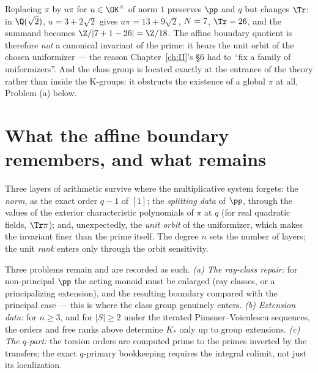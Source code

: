 \begin{remark}\label{XXX:rem:units}
Replacing $\pi$ by $u\pi$ for $u\in\OK^\times$ of norm $1$ preserves $\pp$ and $q$ but
changes $\Tr$: in $\Q(\sqrt2)$, $u=3+2\sqrt2$ gives $u\pi=13+9\sqrt2$, $N=7$,
$\Tr=26$, and the summand becomes $\Z/|7+1-26|=\Z/18$. The affine boundary quotient is
therefore \emph{not} a canonical invariant of the prime: it hears the unit orbit of the
chosen uniformizer --- the reason Chapter~\ref{ch:II}'s \S6 had to ``fix a family of uniformizers''.
And the class group is located exactly at the entrance of the theory rather than inside
the K-groups: it obstructs the existence of a global $\pi$ at all, Problem (a) below.
\end{remark}

\section{What the affine boundary remembers, and what remains}\label{XXX:sec:honest}

Three layers of arithmetic survive where the multiplicative system forgets: the
\emph{norm}, as the exact order $q-1$ of $[1]$; the \emph{splitting data} of $\pp$,
through the values of the exterior characteristic polynomials of $\pi$ at $q$ (for real
quadratic fields, $\Tr\pi$); and, unexpectedly, the \emph{unit orbit} of the uniformizer,
which makes the invariant finer than the prime itself. The degree $n$ sets the number of
layers; the unit \emph{rank} enters only through the orbit sensitivity.

Three problems remain and are recorded as such. \emph{(a) The ray-class repair:} for
non-principal $\pp$ the acting monoid must be enlarged (ray classes, or a principalizing
extension), and the resulting boundary compared with the principal case --- this is where
the class group genuinely enters. \emph{(b) Extension data:} for $n\ge3$, and for
$|S|\ge2$ under the iterated Pimsner--Voiculescu sequences, the orders and free ranks
above determine $K_*$ only up to group extensions. \emph{(c) The $q$-part:} the torsion
orders are computed prime to the primes inverted by the transfers; the exact $q$-primary
bookkeeping requires the integral colimit, not just its localization.

